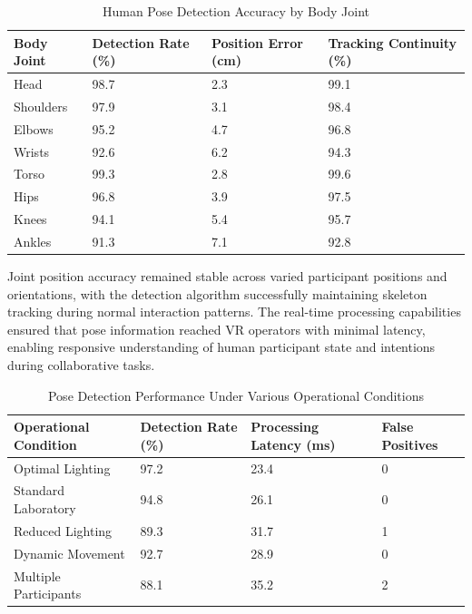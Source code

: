 \begin{table}[H]
    \centering
    \footnotesize
    \begin{tabular}{|p{3cm}|p{2cm}|p{2cm}|p{2cm}|}
        \hline
        \textbf{Body Joint} & \textbf{Detection Rate (\%)} & \textbf{Position Error (cm)} & \textbf{Tracking Continuity (\%)} \\
        \hline
        Head & 98.7 & 2.3 & 99.1 \\
        Shoulders & 97.9 & 3.1 & 98.4 \\
        Elbows & 95.2 & 4.7 & 96.8 \\
        Wrists & 92.6 & 6.2 & 94.3 \\
        Torso & 99.3 & 2.8 & 99.6 \\
        Hips & 96.8 & 3.9 & 97.5 \\
        Knees & 94.1 & 5.4 & 95.7 \\
        Ankles & 91.3 & 7.1 & 92.8 \\
        \hline
    \end{tabular}
    \caption{Human Pose Detection Accuracy by Body Joint}
    \label{tab:pose_detection_accuracy}
\end{table}

Joint position accuracy remained stable across varied participant positions and orientations, with the detection algorithm successfully maintaining skeleton tracking during normal interaction patterns. The real-time processing capabilities ensured that pose information reached VR operators with minimal latency, enabling responsive understanding of human participant state and intentions during collaborative tasks.

\begin{table}[H]
    \centering
    \footnotesize
    \begin{tabular}{|p{3.5cm}|p{2cm}|p{2cm}|p{2cm}|}
        \hline
        \textbf{Operational Condition} & \textbf{Detection Rate (\%)} & \textbf{Processing Latency (ms)} & \textbf{False Positives} \\
        \hline
        Optimal Lighting & 97.2 & 23.4 & 0 \\
        Standard Laboratory & 94.8 & 26.1 & 0 \\
        Reduced Lighting & 89.3 & 31.7 & 1 \\
        Dynamic Movement & 92.7 & 28.9 & 0 \\
        Multiple Participants & 88.1 & 35.2 & 2 \\
        \hline
    \end{tabular}
    \caption{Pose Detection Performance Under Various Operational Conditions}
    \label{tab:pose_detection_conditions}
\end{table}

